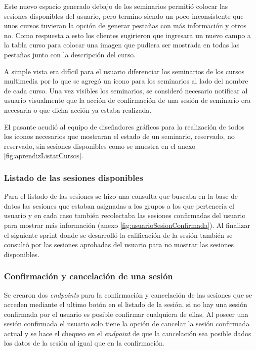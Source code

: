 Este nuevo espacio generado debajo de los seminarios permitió colocar las sesiones disponibles del usuario, pero termino siendo un poco inconsistente que unos cursos tuvieran la opción de generar pestañas con más información y otros no. Como respuesta a esto los clientes sugirieron que ingresara un nuevo campo a la tabla curso para colocar una imagen que pudiera ser mostrada en todas las pestañas junto con la descripción del curso.

A simple vista era difícil para el usuario diferenciar los seminarios de los cursos multimedia por lo que se agregó un icono para los seminarios al lado del nombre de cada curso. Una vez visibles los seminarios, se consideró necesario notificar al usuario visualmente que la acción de confirmación de una sesión de seminario era necesaria o que dicha acción ya estaba realizada.

El pasante acudió al equipo de diseñadores gráficos para la realización de todos los iconos necesarios que mostraran el estado de un seminario, reservado, no reservado, sin sesiones disponibles como se muestra en el anexo \ref{fig:aprendizListarCursos}.

\subsubsection{Listado de las sesiones disponibles}
Para el listado de las sesiones se hizo una consulta que buscaba en la base de datos las sesiones que estaban asignadas a los grupos a los que pertenecía el usuario y en cada caso también recolectaba las sesiones confirmadas del usuario para mostrar más información (anexo \ref{fig:usuarioSesionConfirmada}). Al finalizar el siguiente sprint donde se desarrolló la calificación de la sesión también se consultó por las sesiones aprobadas del usuario para no mostrar las sesiones disponibles.

\subsubsection{Confirmación y cancelación de una sesión}

Se crearon dos \emph{endpoints} para la confirmación y cancelación de las sesiones que se acceden mediante el ultimo botón en el listado de la sesión. si no hay una sesión confirmada por el usuario es posible confirmar cualquiera de ellas. Al poseer una sesión confirmada el usuario solo tiene la opción de cancelar la sesión confirmada actual y se hace el chequeo en el \emph{endpoint} de que la cancelación sea posible dados los datos de la sesión al igual que en la confirmación.

